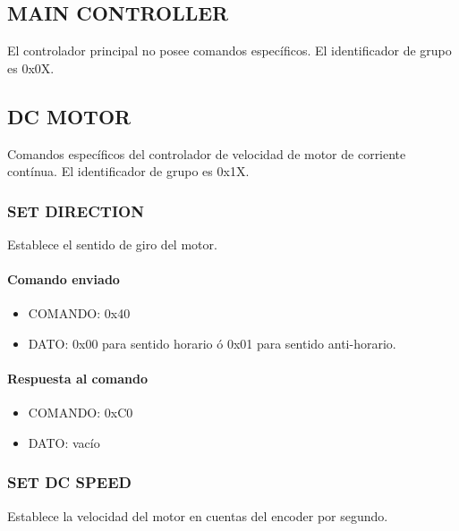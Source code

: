 \subsection{MAIN CONTROLLER}
\label{hA_protocolo_grupo_main_controller}

El controlador principal no posee comandos espec\'ificos.
El identificador de grupo es 0x0X.

\subsection{DC MOTOR}
\label{hA_protocolo_grupo_dc_motor}

Comandos espec\'ificos del controlador de velocidad de motor de corriente cont\'inua.
El identificador de grupo es 0x1X.

\subsubsection{SET DIRECTION}
\label{hA_protocolo_set_direction}

Establece el sentido de giro del motor.

\paragraph*{Comando enviado}

\begin{itemize}
	\item{COMANDO:} 0x40
	\item{DATO:} 0x00 para sentido horario \'o 0x01 para sentido anti-horario.
\end{itemize}

\paragraph*{Respuesta al comando}

\begin{itemize}
	\item{COMANDO:} 0xC0
	\item{DATO:} vac\'io
\end{itemize}

\subsubsection{SET DC SPEED}
\label{hA_protocolo_set_dc_speed}

Establece la velocidad del motor en cuentas del encoder por segundo.

